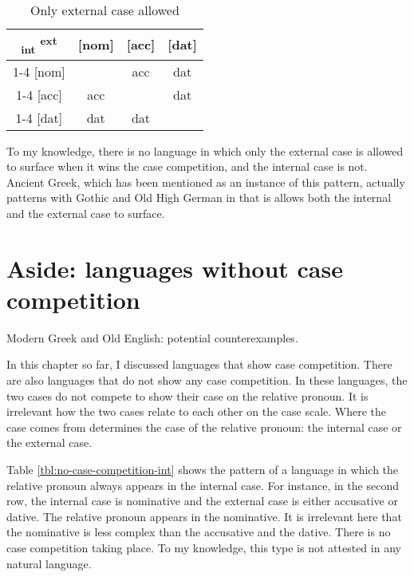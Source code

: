 \begin{table}[H]
  \center
  \caption{Only external case allowed}
  \begin{tabular}{c|c|c|c}
    \toprule
    \textsubscript{\ac{int}} \textsuperscript{\ac{ext}}
           & [\ac{nom}]
           & [\ac{acc}]
           & [\ac{dat}]
           \\ \cmidrule{1-4}
       [\ac{nom}]
           &
           & \ac{acc}
           & \ac{dat}
           \\ \cmidrule{1-4}
       [\ac{acc}]
           & \cellcolor{DG}\ac{acc}
           &
           & \cellcolor{LG}\ac{dat}
           \\ \cmidrule{1-4}
       [\ac{dat}]
           & \ac{dat}
           & \ac{dat}
           &
           \\
     \bottomrule
  \end{tabular}
    \label{tbl:case-competition-ancient-greek}
\end{table}

To my knowledge, there is no language in which only the external case is allowed to surface when it wins the case competition, and the internal case is not. Ancient Greek, which has been mentioned as an instance of this pattern, actually patterns with Gothic and Old High German in that is allows both the internal and the external case to surface.

\section{Aside: languages without case competition}\label{sec:potentiel-counterexamples}

Modern Greek and Old English: potential counterexamples.

In this chapter so far, I discussed languages that show case competition. There are also languages that do not show any case competition. In these languages, the two cases do not compete to show their case on the relative pronoun. It is irrelevant how the two cases relate to each other on the case scale. Where the case comes from determines the case of the relative pronoun: the internal case or the external case.

Table \ref{tbl:no-case-competition-int} shows the pattern of a language in which the relative pronoun always appears in the internal case. For instance, in the second row, the internal case is nominative and the external case is either accusative or dative. The relative pronoun appears in the nominative. It is irrelevant here that the nominative is less complex than the accusative and the dative. There is no case competition taking place. To my knowledge, this type is not attested in any natural language.

